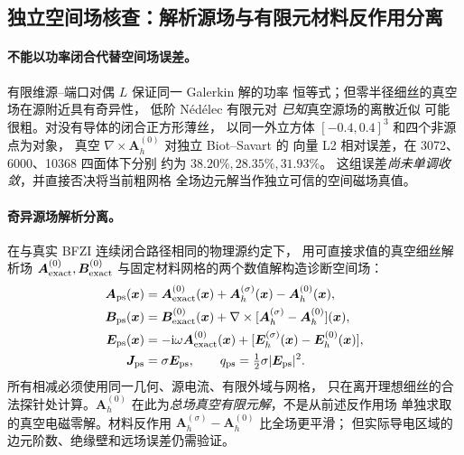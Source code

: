 \subsection{独立空间场核查：解析源场与有限元材料反作用分离}
\label{sec:bfzi-d2-primary-secondary-spatial}

\paragraph{不能以功率闭合代替空间场误差。}
有限维源--端口对偶 $L$ 保证同一 Galerkin 解的功率
恒等式；但零半径细丝的真空场在源附近具有奇异性，
低阶 N\'ed\'elec 有限元对 \emph{已知}真空源场的离散近似
可能很粗。对没有导体的闭合正方形薄丝，
以同一外立方体 $[-0.4,0.4]^3$ 和四个非源点为对象，
真空 $\nabla\times\bm A_h^{(0)}$ 对独立 Biot--Savart 的
向量 L2 相对误差，在 3072、6000、10368 四面体下分别
约为 $38.20\%,28.35\%,31.93\%$。
这组误差\emph{尚未单调收敛}，并直接否决将当前粗网格
全场边元解当作独立可信的空间磁场真值。

\paragraph{奇异源场解析分离。}
在与真实 BFZI 连续闭合路径相同的物理源约定下，
用可直接求值的真空细丝解析场
$\bm A^{(0)}_{\rm exact},\bm B^{(0)}_{\rm exact}$
与固定材料网格的两个数值解构造诊断空间场：
\begin{align}
\bm A_{\rm ps}(\bm x)
 &=\bm A_{\rm exact}^{(0)}(\bm x)+
   \bm A_h^{(\sigma)}(\bm x)-\bm A_h^{(0)}(\bm x),\\
\bm B_{\rm ps}(\bm x)
 &=\bm B_{\rm exact}^{(0)}(\bm x)+
   \nabla\times[\bm A_h^{(\sigma)}-\bm A_h^{(0)}](\bm x),\\
\bm E_{\rm ps}(\bm x)
 &=-\mathrm i\omega\bm A_{\rm exact}^{(0)}(\bm x)+
    [\bm E_h^{(\sigma)}(\bm x)-\bm E_h^{(0)}(\bm x)],\\
\bm J_{\rm ps}&=\sigma\bm E_{\rm ps},\qquad
q_{\rm ps}=\tfrac12\sigma|\bm E_{\rm ps}|^2.
\end{align}
所有相减必须使用同一几何、源电流、有限外域与网格，
只在离开理想细丝的合法探针处计算。$\bm A_h^{(0)}$
在此为\emph{总场真空有限元解}，不是从前述反作用场
单独求取的真空电磁零解。材料反作用
$\bm A_h^{(\sigma)}-\bm A_h^{(0)}$ 比全场更平滑；
但实际导电区域的边元阶数、绝缘壁和远场误差仍需验证。

